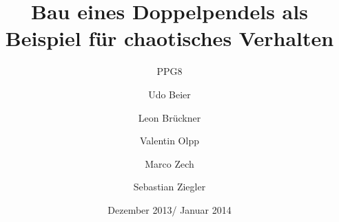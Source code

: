 
%


\title{Bau eines Doppelpendels als Beispiel für chaotisches Verhalten}
\subtitle{PPG8}
\date{Dezember 2013/ Januar 2014}
\author{Udo Beier \and Leon Brückner \and Valentin Olpp \and Marco Zech \and Sebastian Ziegler}
\maketitle
\tableofcontents
\newpage
\listoffigures
\listoftables
\newpage






\newpage
%
%


